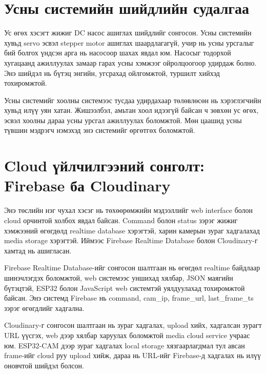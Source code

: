 \documentclass[12pt,a4paper]{report}
\begin{document}
\section{Усны системийн шийдлийн судалгаа}

Ус өгөх хэсэгт жижиг DC насос ашиглах шийдлийг сонгосон. Усны системийн хувьд servo эсвэл stepper motor ашиглах шаардлагагүй, учир нь усны урсгалыг бий болгох үндсэн арга нь насосоор шахах явдал юм. Насосыг тодорхой хугацаанд ажиллуулах замаар гарах усны хэмжээг ойролцоогоор удирдаж болно. Энэ шийдэл нь бүтэц энгийн, угсрахад ойлгомжтой, туршилт хийхэд тохиромжтой.

Усны системийг хоолны системээс тусдаа удирдахаар төлөвлөсөн нь хэрэглэгчийн хувьд илүү уян хатан. Жишээлбэл, амьтан хоол идээгүй байсан ч зөвхөн ус өгөх, эсвэл хоолны дараа усны урсгал ажиллуулах боломжтой. Мөн цаашид усны түвшин мэдрэгч нэмэхэд энэ системийг өргөтгөх боломжтой.

\section{Cloud үйлчилгээний сонголт: Firebase ба Cloudinary}

Энэ төслийн нэг чухал хэсэг нь төхөөрөмжийн мэдээллийг web interface болон cloud орчинтой холбох явдал байсан. Command болон status зэрэг жижиг хэмжээний өгөгдөлд realtime database хэрэгтэй, харин камерын зураг хадгалахад media storage хэрэгтэй. Иймээс Firebase Realtime Database болон Cloudinary-г хамтад нь ашигласан.

Firebase Realtime Database-ийг сонгосон шалтгаан нь өгөгдөл realtime байдлаар шинэчлэгдэх боломжтой, web системээс уншихад хялбар, JSON маягийн бүтэцтэй, ESP32 болон JavaScript web системтэй уялдуулахад тохиромжтой байсан. Энэ системд Firebase нь command, cam\_ip, frame\_url, last\_frame\_ts зэрэг өгөгдлийг хадгална.

Cloudinary-г сонгосон шалтгаан нь зураг хадгалах, upload хийх, хадгалсан зурагт URL үүсгэх, web дээр хялбар харуулах боломжтой media cloud service учраас юм. ESP32-CAM дээр зураг хадгалах local storage хязгаарлагдмал тул авсан frame-ийг cloud руу upload хийж, дараа нь URL-ийг Firebase-д хадгалах нь илүү оновчтой шийдэл болсон.
\end{document}
